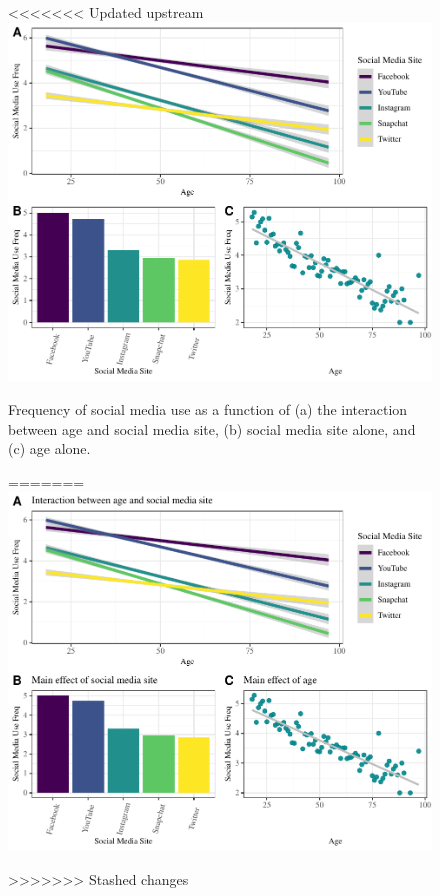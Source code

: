 \documentclass[man, fleqn, noextraspace]{apa6}
\theoremstyle{definition}
\theoremstyle{definition}
\theoremstyle{definition}
\theoremstyle{remark}
\begin{document}
\begin{figure}
\centering
<<<<<<< Updated upstream
\includegraphics{final_manuscript_files/figure-latex/fig1-1.pdf}
\caption{\label{fig:fig1}Frequency of social media use as a function of (a)
the interaction between age and social media site, (b) social media site
alone, and (c) age alone.}
=======
\includegraphics{final_manuscript_files/figure-latex/ash_analyses_viz-1.pdf}
\caption{}
>>>>>>> Stashed changes
\end{figure}
\end{document}
